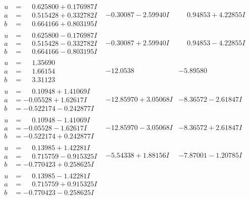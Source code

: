 \documentclass[1p]{elsarticle_modified}
\theoremstyle{definition}
\begin{document}
$$\begin{array}{c|c|c}
\begin{aligned}
u &= \phantom{-}0.625800 + 0.176987 I \\
a &= \phantom{-}0.515428 + 0.332782 I \\
b &= \phantom{-}0.664166 + 0.803195 I\end{aligned}
 & -0.30087 - 2.59940 I & \phantom{-}0.94853 + 4.22855 I \\ \hline\begin{aligned}
u &= \phantom{-}0.625800 - 0.176987 I \\
a &= \phantom{-}0.515428 - 0.332782 I \\
b &= \phantom{-}0.664166 - 0.803195 I\end{aligned}
 & -0.30087 + 2.59940 I & \phantom{-}0.94853 - 4.22855 I \\ \hline\begin{aligned}
u &= \phantom{-}1.35690\phantom{ +0.000000I} \\
a &= \phantom{-}1.66154\phantom{ +0.000000I} \\
b &= \phantom{-}3.31123\phantom{ +0.000000I}\end{aligned}
 & -12.0538\phantom{ +0.000000I} & -5.89580\phantom{ +0.000000I} \\ \hline\begin{aligned}
u &= \phantom{-}0.10948 + 1.41069 I \\
a &= -0.05528 + 1.62617 I \\
b &= -0.522174 - 0.242877 I\end{aligned}
 & -12.85970 + 3.05068 I & -8.36572 - 2.61847 I \\ \hline\begin{aligned}
u &= \phantom{-}0.10948 - 1.41069 I \\
a &= -0.05528 - 1.62617 I \\
b &= -0.522174 + 0.242877 I\end{aligned}
 & -12.85970 - 3.05068 I & -8.36572 + 2.61847 I \\ \hline\begin{aligned}
u &= \phantom{-}0.13985 + 1.42281 I \\
a &= \phantom{-}0.715759 - 0.915325 I \\
b &= -0.770423 + 0.258625 I\end{aligned}
 & -5.54338 + 1.88156 I & -7.87001 - 1.20785 I \\ \hline\begin{aligned}
u &= \phantom{-}0.13985 - 1.42281 I \\
a &= \phantom{-}0.715759 + 0.915325 I \\
b &= -0.770423 - 0.258625 I\end{aligned}

\end{array}$$
\end{document}
